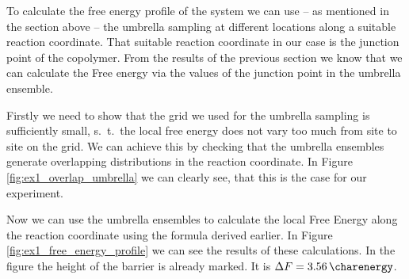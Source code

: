 \documentclass[../main.tex]{subfiles}
\begin{document}
To calculate the free energy profile of the system we can use -- as mentioned in the section above -- the umbrella sampling at different locations along a suitable reaction coordinate.
That suitable reaction coordinate in our case is the junction point of the copolymer.
From the results of the previous section we know that we can calculate the Free energy via the values of the junction point in the umbrella ensemble.
\par

Firstly we need to show that the grid we used for the umbrella sampling is sufficiently small, s.~t.~the local free energy does not vary too much from site to site on the grid.
We can achieve this by checking that the umbrella ensembles generate overlapping distributions in the reaction coordinate.
In Figure \ref{fig:ex1_overlap_umbrella} we can clearly see, that this is the case for our experiment.
\par

Now we can use the umbrella ensembles to calculate the local Free Energy along the reaction coordinate using the formula derived earlier.
In Figure \ref{fig:ex1_free_energy_profile} we can see the results of these calculations.
In the figure the height of the barrier is already marked.
It is $\Delta F = \SI{3.56}{\charenergy}$.


\ifSubfilesClassLoaded{
}{
    \newpage
}
\end{document}
